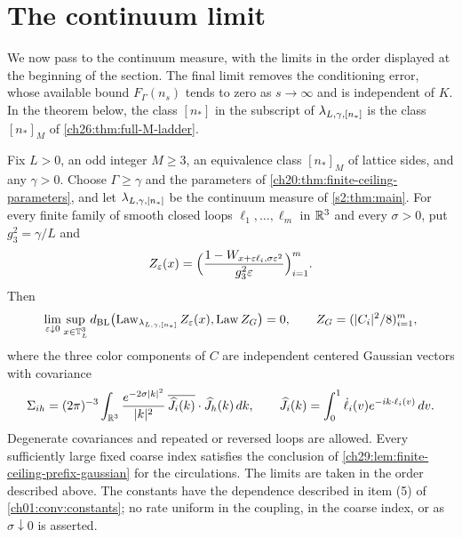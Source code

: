 \section{The continuum limit}\label{ch29:sec:continuum}

We now pass to the continuum measure, with the limits in the order displayed at the beginning of the section. The final limit removes the conditioning error, whose available bound $F_\Gamma(n_s)$ tends to zero as $s\to\infty$ and is independent of $K$. In the theorem below, the class $[n_*]$ in the subscript of $\lambda_{L,\gamma,[n_*]}$ is the class $[n_*]_M$ of \cref{ch26:thm:full-M-ladder}.

\begin{theorem}\label{ch29:thm:short-distance-gaussian}
Fix $L>0$, an odd integer $M\ge3$, an equivalence class $[n_*]_M$ of lattice sides, and any $\gamma>0$. Choose $\Gamma\ge\gamma$ and the parameters of \cref{ch20:thm:finite-ceiling-parameters}, and let $\lambda_{L,\gamma,[n_*]}$ be the continuum measure of \cref{s2:thm:main}. For every finite family of smooth closed loops $\ell_1,\dots,\ell_m$ in $\mathbb R^3$ and every $\sigma>0$, put $g_3^2=\gamma/L$ and
\[
 Z_\varepsilon(x)=\Bigl(\frac{1-W_{x+\varepsilon\ell_i,\sigma\varepsilon^2}}{g_3^2\varepsilon}\Bigr)_{i=1}^m.
\]
Then
\[
 \lim_{\varepsilon\downarrow0}\sup_{x\in\mathbb T_L^3}d_{\mathrm{BL}}\bigl(\operatorname{Law}_{\lambda_{L,\gamma,[n_*]}}Z_\varepsilon(x),\operatorname{Law} Z_G\bigr)=0,\qquad Z_G=(|C_i|^2/8)_{i=1}^m,
\]
where the three color components of $C$ are independent centered Gaussian vectors with covariance
\[
 \Sigma_{ih}=(2\pi)^{-3}\int_{\mathbb R^3}\frac{e^{-2\sigma|k|^2}}{|k|^2}\,\overline{\widehat J_i(k)}\cdot\widehat J_h(k)\,dk,\qquad \widehat J_i(k)=\int_0^1\dot\ell_i(v)e^{-ik\cdot\ell_i(v)}\,dv.
\]
Degenerate covariances and repeated or reversed loops are allowed. Every sufficiently large fixed coarse index satisfies the conclusion of \cref{ch29:lem:finite-ceiling-prefix-gaussian} for the circulations. The limits are taken in the order described above. The constants have the dependence described in item (5) of \cref{ch01:conv:constants}; no rate uniform in the coupling, in the coarse index, or as $\sigma\downarrow0$ is asserted.
\end{theorem}

